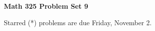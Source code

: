 \documentclass[12pt]{article}
\begin{document}
\def\ctln{\centerline}
\def\msk{\medskip}
\def\bsk{\bigskip}
\def\ssk{\smallskip}
\def\hsk{\hskip.3in}
\def\ra{\rightarrow}
\def\ubr{\underbar}
\def\dsp{\displaystyle}

\def\mt{{\mathcal T}}
\def\mb{{\mathcal B}}
\def\ms{{\mathcal S}}
\def\mu{{\mathcal U}}
\def\mv{{\mathcal V}}

\def\bbr{{\mathbb R}}
\def\bbz{{\mathbb Z}}
\def\bbq{{\mathbb Q}}
\def\bbn{{\mathbb N}}
\def\spc{$~$\hskip.15in$~$}

\def\sset{\subseteq}
\def\del{\partial}
\def\lra{$\Leftrightarrow$}
\def\bra{$\Rightarrow$}




\ctln{\bf Math 325 Problem Set 9}

\msk

\ctln{Starred (*) problems are due Friday, November 2.}
\end{document}
